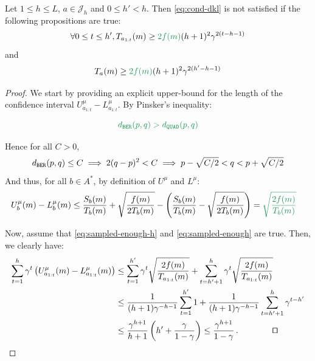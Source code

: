 \documentclass[runningheads]{llncs}
\newcommand{\diff}[1]{\textcolor{ForestGreen}{#1}}
\begin{document}
\begin{lemma}
\label{lemma:ci-length}
Let $1 \leq h \leq L$, $a\in \mathcal{J}_h$ and $0 \leq h' < h$. Then  \eqref{eq:cond-dkl} is not satisfied if the following propositions are true:
\begin{equation}
\label{eq:sampled-enough-h}
   \forall 0\leq t\leq h', T_{a_{1:t}}(m) \geq \diff{2f(m)}(h+1)^2\gamma^{2(t-h-1)}
\end{equation}
and
\begin{equation}
\label{eq:sampled-enough}
   T_{a}(m) \geq \diff{2f(m)}(h+1)^2\gamma^{2(h'-h-1)}
\end{equation}
\end{lemma}
\begin{proof}
We start by providing an explicit upper-bound for the length of the confidence interval $U^{\mu}_{a_{1:t}} - L^{\mu}_{a_{1:t}}$. By Pinsker's inequality:
 
\begin{equation*}
    \diff{\dber(p, q) > \dquad(p, q)}
\end{equation*}

Hence for all $C>0$, 
\begin{equation*}
    d_\texttt{BER}(p, q) \leq C   \implies 2(q - p)^2 < C  \implies p - \sqrt{C/2} < q < p + \sqrt{C/2}
\end{equation*}
And thus, for all $b\in A^*$, by definition of $U^{\mu}$ and $L^{\mu}$:
\begin{align*}
    U^{\mu}_{b}(m) - L^{\mu}_{b}(m) &\leq \frac{S_b(m)}{T_b(m)} + \sqrt{\frac{f(m)}{2T_b(m)}} -  \left(\frac{S_b(m)}{T_b(m)} - \sqrt{\frac{f(m)}{2T_b(m)}}\right) 
    = \diff{\sqrt{\frac{2f(m)}{T_b(m)}}}
\end{align*}

Now, assume that \eqref{eq:sampled-enough-h} and \eqref{eq:sampled-enough} are true. Then, we clearly have:
\begin{align*}
    \sum_{t=1}^h \gamma^t\left(U^{\mu}_{a_{1:t}}(m) - L^{\mu}_{a_{1:t}}(m)\right) &\leq \sum_{t=1}^{h'} \gamma^t \sqrt{\frac{2f(m)}{T_{a_{1:t}}(m)}} + \sum_{t=h'+1}^h \gamma^t \sqrt{\frac{2f(m)}{T_{a_{1:t}}(m)}} \\
    &\leq \frac{1}{(h+1)\gamma^{-h-1}} \sum_{t=1}^{h'} 1 + \frac{1}{(h+1)\gamma^{-h-1}} \sum_{t=h'+1}^h \gamma^{t-h'}  \\
    &\leq \frac{\gamma^{h+1}}{h+1} \left( h' + \frac{\gamma}{1-\gamma} \right)\leq \frac{\gamma^{h+1}}{1-\gamma}\,.\qquad\qquad\qed
\end{align*}
\end{proof}
\end{document}
